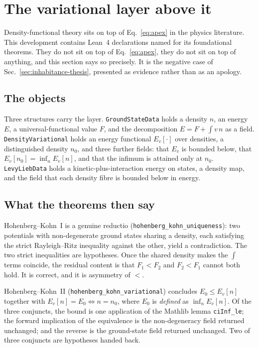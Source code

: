 \documentclass[aps,prd,reprint,nofootinbib,superscriptaddress]{revtex4-2}
\newcommand{\thm}[1]{\texttt{#1}}   %
\newcommand{\Lean}{Lean~4}
\begin{document}
\section{The variational layer above it}
\label{sec:dft-scope}

Density-functional theory sits on top of Eq.~\eqref{eq:apex} in the physics literature. This
development contains \Lean{} declarations named for its foundational theorems. They do not sit on top
of Eq.~\eqref{eq:apex}, they do not sit on top of anything, and this section says so precisely. It is
the negative case of Sec.~\ref{sec:inhabitance-thesis}, presented as evidence rather than as an
apology.

\subsection{The objects}

Three structures carry the layer. \thm{GroundStateData} holds a density $n$, an energy $E$, a
universal-functional value $F$, and the decomposition $E=F+\int v\,n$ as a field.
\thm{DensityVariational} holds an energy functional $E_{v}[\cdot]$ over densities, a distinguished
density $n_{0}$, and three further fields: that $E_{v}$ is bounded below, that
$E_{v}[n_{0}]=\inf_{n}E_{v}[n]$, and that the infimum is attained only at $n_{0}$.
\thm{LevyLiebData} holds a kinetic-plus-interaction energy on states, a density map, and the field
that each density fibre is bounded below in energy.

\subsection{What the theorems then say}

Hohenberg--Kohn~I is a genuine reductio (\thm{hohenberg\_kohn\_uniqueness}): two potentials with
non-degenerate ground states sharing a density, each satisfying the strict Rayleigh--Ritz inequality
against the other, yield a contradiction. The two strict inequalities are hypotheses. Once the shared
density makes the $\int$ terms coincide, the residual content is that $F_{1}<F_{2}$ and
$F_{2}<F_{1}$ cannot both hold. It is correct, and it is asymmetry of $<$.

Hohenberg--Kohn~II (\thm{hohenberg\_kohn\_variational}) concludes $E_{0}\le E_{v}[n]$ together with
$E_{v}[n]=E_{0}\iff n=n_{0}$, where $E_{0}$ is \emph{defined} as $\inf_{n}E_{v}[n]$. Of the three
conjuncts, the bound is one application of the Mathlib lemma \texttt{ciInf\_le}; the forward
implication of the equivalence is the non-degeneracy field returned unchanged; and the reverse is the
ground-state field returned unchanged. Two of three conjuncts are hypotheses handed back.
\end{document}
